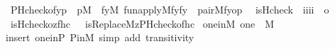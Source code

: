 \begin{isabellebody}
\ \ {\isachardoublequoteopen}PHcheck{\isacharparenleft}{\kern0pt}o{\isacharcomma}{\kern0pt}f{\isacharcomma}{\kern0pt}y{\isacharcomma}{\kern0pt}p{\isacharparenright}{\kern0pt}\ {\isasymequiv}\ p{\isasymin}M\ {\isasymand}\ {\isacharparenleft}{\kern0pt}{\isasymexists}fy{\isacharbrackleft}{\kern0pt}{\isacharhash}{\kern0pt}{\isacharhash}{\kern0pt}M{\isacharbrackright}{\kern0pt}{\isachardot}{\kern0pt}\ fun{\isacharunderscore}{\kern0pt}apply{\isacharparenleft}{\kern0pt}{\isacharhash}{\kern0pt}{\isacharhash}{\kern0pt}M{\isacharcomma}{\kern0pt}f{\isacharcomma}{\kern0pt}y{\isacharcomma}{\kern0pt}fy{\isacharparenright}{\kern0pt}\ {\isasymand}\ pair{\isacharparenleft}{\kern0pt}{\isacharhash}{\kern0pt}{\isacharhash}{\kern0pt}M{\isacharcomma}{\kern0pt}fy{\isacharcomma}{\kern0pt}o{\isacharcomma}{\kern0pt}p{\isacharparenright}{\kern0pt}{\isacharparenright}{\kern0pt}{\isachardoublequoteclose}\isanewline
\isanewline
{}\isamarkupfalse%
\isanewline
\ \ is{\isacharunderscore}{\kern0pt}Hcheck\ {\isacharcolon}{\kern0pt}{\isacharcolon}{\kern0pt}\ {\isachardoublequoteopen}{\isacharbrackleft}{\kern0pt}i{\isacharcomma}{\kern0pt}i{\isacharcomma}{\kern0pt}i{\isacharcomma}{\kern0pt}i{\isacharbrackright}{\kern0pt}\ {\isasymRightarrow}\ o{\isachardoublequoteclose}\ \isanewline
\ \ {\isachardoublequoteopen}is{\isacharunderscore}{\kern0pt}Hcheck{\isacharparenleft}{\kern0pt}o{\isacharcomma}{\kern0pt}z{\isacharcomma}{\kern0pt}f{\isacharcomma}{\kern0pt}hc{\isacharparenright}{\kern0pt}\ \ {\isasymequiv}\ is{\isacharunderscore}{\kern0pt}Replace{\isacharparenleft}{\kern0pt}{\isacharhash}{\kern0pt}{\isacharhash}{\kern0pt}M{\isacharcomma}{\kern0pt}z{\isacharcomma}{\kern0pt}PHcheck{\isacharparenleft}{\kern0pt}o{\isacharcomma}{\kern0pt}f{\isacharparenright}{\kern0pt}{\isacharcomma}{\kern0pt}hc{\isacharparenright}{\kern0pt}{\isachardoublequoteclose}\isanewline
\isanewline
{}\isamarkupfalse%
\ one{\isacharunderscore}{\kern0pt}in{\isacharunderscore}{\kern0pt}M{\isacharcolon}{\kern0pt}\ {\isachardoublequoteopen}one\ {\isasymin}\ M{\isachardoublequoteclose}\isanewline
%
\isadelimproof
\ \ %
\endisadelimproof
%
\isatagproof
{}\isamarkupfalse%
\ {\isacharparenleft}{\kern0pt}insert\ one{\isacharunderscore}{\kern0pt}in{\isacharunderscore}{\kern0pt}P\ P{\isacharunderscore}{\kern0pt}in{\isacharunderscore}{\kern0pt}M{\isacharcomma}{\kern0pt}\ simp\ add{\isacharcolon}{\kern0pt}\ transitivity{\isacharparenright}{\kern0pt}%
\endisatagproof
{\isafoldproof}%
%
\isadelimproof
\isanewline
%
\endisadelimproof
\isanewline
{}\isamarkupfalse%

\end{isabellebody}
